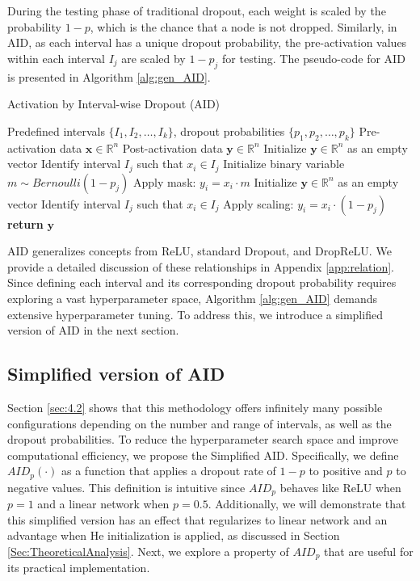 During the testing phase of traditional dropout, each weight is scaled by the probability \(1-p\), which is the chance that a node is not dropped.
Similarly, in AID, as each interval has a unique dropout probability, the pre-activation values within each interval $I_j$ are scaled by \(1-p_j\) for testing.
The pseudo-code for AID is presented in Algorithm \ref{alg:gen_AID}.

\begin{algorithm}[h]
   \caption{Activation by Interval-wise Dropout (AID)}
   \label{alg:gen_AID}
\begin{algorithmic}
     Predefined intervals $\{I_1, I_2, \dots, I_k\}$, dropout probabilities $\{p_1, p_2, \dots, p_k\}$
     Pre-activation data $\mathbf{x} \in \mathbb{R}^n$
     Post-activation data $\mathbf{y} \in \mathbb{R}^n$
        \STATE Initialize $\mathbf{y} \in \mathbb{R}^n$ as an empty vector
            \STATE Identify interval \( I_j \) such that \( x_i \in I_j \)
            \STATE Initialize binary variable \( m \sim Bernoulli(1 - p_j) \)
            \STATE Apply mask: \( y_i = x_i \cdot m \)
        \ENDFOR
        \STATE Initialize $\mathbf{y} \in \mathbb{R}^n$ as an empty vector
            \STATE Identify interval \( I_j \) such that \( x_i \in I_j \)
            \STATE Apply scaling: \( y_i = x_i \cdot (1 - p_j) \)
        \ENDFOR
    \ENDIF
    \STATE \textbf{return} $\mathbf{y}$
\end{algorithmic}
\end{algorithm}

AID generalizes concepts from ReLU, standard Dropout, and DropReLU.
We provide a detailed discussion of these relationships in Appendix \ref{app:relation}.
Since defining each interval and its corresponding dropout probability requires exploring a vast hyperparameter space, Algorithm \ref{alg:gen_AID} demands extensive hyperparameter tuning.
To address this, we introduce a simplified version of AID in the next section.


\subsection{Simplified version of AID}
Section \ref{sec:4.2} shows that this methodology offers infinitely many possible configurations depending on the number and range of intervals, as well as the dropout probabilities.
To reduce the hyperparameter search space and improve computational efficiency, we propose the Simplified AID.
Specifically, we define $AID_p(\cdot)$ as a function that applies a dropout rate of $1-p$ to positive and $p$ to negative values.
This definition is intuitive since $AID_p$ behaves like ReLU when $p=1$ and a linear network when $p=0.5$.
Additionally, we will demonstrate that this simplified version has an effect that regularizes to linear network and an advantage when He initialization is applied, as discussed in Section \ref{Sec:TheoreticalAnalysis}.
Next, we explore a property of $AID_p$ that are useful for its practical implementation.


